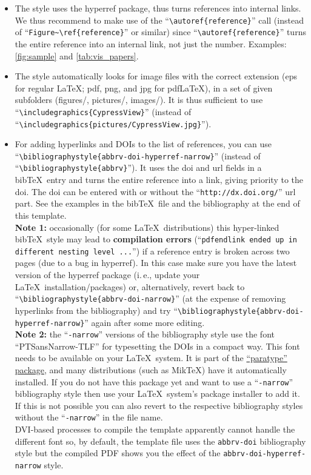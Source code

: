 \documentclass[review]{vgtc}                 %
\begin{document}
\begin{itemize}
\item The style uses the hyperref package, thus turns references into internal links. We thus recommend to make use of the ``\texttt{\textbackslash autoref\{reference\}}'' call (instead of ``\texttt{Figure\~{}\textbackslash ref\{reference\}}'' or similar) since ``\texttt{\textbackslash autoref\{reference\}}'' turns the entire reference into an internal link, not just the number. Examples: \autoref{fig:sample} and \autoref{tab:vis_papers}.
\item The style automatically looks for image files with the correct extension (eps for regular \LaTeX; pdf, png, and jpg for pdf\LaTeX), in a set of given subfolders (figures/, pictures/, images/). It is thus sufficient to use ``\texttt{\textbackslash includegraphics\{CypressView\}}'' (instead of ``\texttt{\textbackslash includegraphics\{pictures/CypressView.jpg\}}'').
\item For adding hyperlinks and DOIs to the list of references, you can use ``\texttt{\textbackslash bibliographystyle\{abbrv-doi-hyperref-narrow\}}'' (instead of ``\texttt{\textbackslash bibliographystyle\{abbrv\}}''). It uses the doi and url fields in a bib\TeX\ entry and turns the entire reference into a link, giving priority to the doi. The doi can be entered with or without the ``\texttt{http://dx.doi.org/}'' url part. See the examples in the bib\TeX\ file and the bibliography at the end of this template.\\[1em]
\textbf{Note 1:} occasionally (for some \LaTeX\ distributions) this hyper-linked bib\TeX\ style may lead to \textbf{compilation errors} (``\texttt{pdfendlink ended up in different nesting level ...}'') if a reference entry is broken across two pages (due to a bug in hyperref). In this case make sure you have the latest version of the hyperref package (i.\,e., update your \LaTeX\ installation/packages) or, alternatively, revert back to ``\texttt{\textbackslash bibliographystyle\{abbrv-doi-narrow\}}'' (at the expense of removing hyperlinks from the bibliography) and try ``\texttt{\textbackslash bibliographystyle\{abbrv-doi-hyperref-narrow\}}'' again after some more editing.\\[1em]
\textbf{Note 2:} the ``\texttt{-narrow}'' versions of the bibliography style use the font ``PTSansNarrow-TLF'' for typesetting the DOIs in a compact way. This font needs to be available on your \LaTeX\ system. It is part of the \href{https://www.ctan.org/pkg/paratype}{``paratype'' package}, and many distributions (such as MikTeX) have it automatically installed. If you do not have this package yet and want to use a ``\texttt{-narrow}'' bibliography style then use your \LaTeX\ system's package installer to add it. If this is not possible you can also revert to the respective bibliography styles without the ``\texttt{-narrow}'' in the file name.\\[1em]
DVI-based processes to compile the template apparently cannot handle the different font so, by default, the template file uses the \texttt{abbrv-doi} bibliography style but the compiled PDF shows you the effect of the \texttt{abbrv-doi-hyperref-narrow} style.
\end{itemize}
\end{document}
